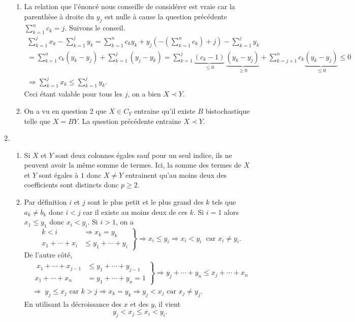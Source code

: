 \begin{enumerate}
\begin{enumerate}
  \item La relation que l'énoncé nous conseille de considérer est vraie car la parenthèse à droite du $y_j$ est nulle à cause la question précédente $\sum_{k=1}^{n} c_k = j$. Suivons le conseil.
\begin{multline*}
  \sum_{k=1}^{j}x_k - \sum_{k=1}^{j} y_k =
 \sum_{k=1}^nc_k y_k + y_j\left(-\left( \sum_{k=1}^{n}c_k\right)  + j \right) - \sum_{k=1}^jy_k \\
= \sum_{k=1}^nc_k (y_k - y_j) + \sum_{k=1}^j(y_j - y_k)
= \sum_{k=1}^j \underset{ \leq 0}{\underbrace{(c_k - 1)}} \, \underset{ \geq 0}{\underbrace{(y_k - y_j)}} + \sum_{k= j + 1}^nc_k \underset{\leq 0}{\underbrace{(y_k - y_j)}}
\leq 0\\
\Rightarrow \sum_{k=1}^{j}x_k   \leq \sum_{k=1}^{j} y_k .
\end{multline*}
Ceci étant valable pour tous les $j$, on a bien $X \prec Y$.

  \item On a vu en question 2 que $X \in C_Y$ entraine qu'il existe $B$ bistochastique telle que $X = B Y$. La question précédente entraine $X \prec Y$.

 \end{enumerate}

 \item
 \begin{enumerate}
  \item Si $X$ et $Y$ sont deux colonnes égales sauf pour un seul indice, ils ne peuvent avoir la même somme de termes. Ici, la somme des termes de $X$ et $Y$ sont égales à $1$ donc $X\neq Y$ entrainent qu'au moins deux des coefficients sont distincts donc $p \geq 2$.
  
  \item Par définition $i$ et $j$ sont le plus petit et le plus grand des $k$ tels que $a_k \neq b_k$ donc $i < j$ car il existe au moins deux de ces $k$.\newline
  Si $i=1$ alors $x_1 \leq y_1$ donc $x_i < y_i$. Si $i > 1$, on a
\[
\left. 
\begin{aligned}
 k < i &\Rightarrow x_k = y_k \\
 x_1 + \cdots + x_{i} &\leq y_1 + \cdots + y_i 
\end{aligned}
\right\rbrace 
\Rightarrow x_i \leq y_i \Rightarrow x_i < y_i\;\text{ car } x_i \neq y_i.
\]
De l'autre côté,
\begin{multline*}
\left. 
\begin{aligned}\
 x_1 + \cdots + x_{j-1} &\leq y_1 + \cdots + y_{j-1} \\
 x_1 + \cdots + x_n &= y_1 + \cdots + y_n =1
\end{aligned}
\right\rbrace 
\Rightarrow
y_j + \cdots + y_n \leq x_j + \cdots + x_n \\
\Rightarrow\;y_j \leq x_j \text{ car } k > j \Rightarrow x_k = y_k  
\Rightarrow y_j < x_j \text{ car } x_j \neq y_j.
\end{multline*}
En utilisant la décroissance des $x$ et des $y$, il vient
\[
 y_j < x_j \leq x_i < y_i.
\]


\end{enumerate}
\end{enumerate}
